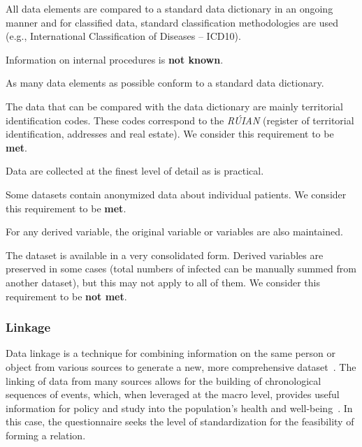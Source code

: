 \begin{QandA}
    \item All data elements are compared to a standard data dictionary in an ongoing manner and for classified data, standard classification methodologies are used (e.g., International Classification of Diseases – ICD10).
    \begin{answered}
        Information on internal procedures is \textbf{not known}.
    \end{answered}

    \item As many data elements as possible conform to a standard data dictionary.
    \begin{answered}
        The data that can be compared with the data dictionary are mainly territorial identification codes.
        These codes correspond to the \textit{RÚIAN} (register of territorial identification, addresses and real estate).
        We consider this requirement to be \textbf{met}.
    \end{answered}

    \item Data are collected at the finest level of detail as is practical.
    \begin{answered}
        Some datasets contain anonymized data about individual patients.
        We consider this requirement to be \textbf{met}.
    \end{answered}

    \item For any derived variable, the original variable or variables are also maintained.
    \begin{answered}
        The dataset is available in a very consolidated form.
        Derived variables are preserved in some cases (total numbers of infected can be manually summed from another dataset), but this may not apply to all of them.
        We consider this requirement to be \textbf{not met}.
    \end{answered}

\end{QandA}

\subsubsection{Linkage}

Data linkage is a technique for combining information on the same person or object from various sources to generate a new, more comprehensive dataset~\cite{tasmania-linkage}.
The linking of data from many sources allows for the building of chronological sequences of events, which, when leveraged at the macro level, provides useful information for policy and study into the population's health and well-being~\cite{tasmania-linkage}.
In this case, the questionnaire seeks the level of standardization for the feasibility of forming a relation.


